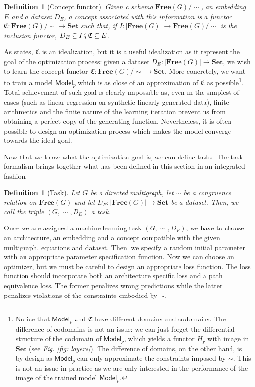 \documentclass[11pt,a4paper,openright,twoside]{report}
\newcounter{mycounter}
\theoremstyle{plain}
\newtheorem{definition}[mycounter]{Definition}
\theoremstyle{definition}
\begin{document}
\begin{definition}[Concept functor]
  Given a schema $\mathbf{Free}(G)/{\sim}$, an embedding $E$ and a dataset $D_E$, a concept associated with this information is a functor $\mathfrak{C}: \mathbf{Free}(G)/{\sim} \to \mathbf{Set}$ such that, if $I: |\mathbf{Free}(G)| \to \mathbf{Free}(G)/{\sim}$ is the inclusion functor, $D_E \subseteq I \fatsemi \mathfrak{C} \subseteq E$.
\end{definition}

As \cite{gavranovic2019compositional} states, $\mathfrak{C}$ is an idealization, but it is a useful idealization as it represent the goal of the optimization process: given a dataset $D_E: |\mathbf{Free}(G)| \to \mathbf{Set}$, we wish to learn the concept functor $\mathfrak{C}: \mathbf{Free}(G)/{\sim} \to \mathbf{Set}$. More concretely, we want to train a model $\mathsf{Model}_p$ which is as close of an approximation of $\mathfrak{C}$ as possible\footnote{Notice that $\mathsf{Model}_p$ and $\mathfrak{C}$ have different domains and codomains. The difference of codomains is not an issue: we can just forget the differential structure of the codomain of $\mathsf{Model}_p$, which yields a functor $H_p$ with image in $\mathbf{Set}$ (see \textit{Fig. \ref{fig: layers}}). The difference of domains, on the other hand, is by design as $\mathsf{Model}_p$ can only approximate the constraints imposed by $\sim$. This is not an issue in practice as we are only interested in the performance of the image of the trained model $\mathsf{Model}_p$.}. Total achievement of such goal is clearly impossible as, even in the simplest of cases (such as linear regression on synthetic linearly generated data), finite arithmetics and the finite nature of the learning iteration prevent us from obtaining a perfect copy of the generating function.
Nevertheless, it is often possible to design an optimization process which makes the model converge towards the ideal goal.

Now that we know what the optimization goal is, we can define tasks. The task formalism brings together what has been defined in this section in an integrated fashion.

\begin{definition}[Task]
  Let $G$ be a directed multigraph, let ${\sim}$ be a congruence relation on $\mathbf{Free}(G)$ and let $D_E: |\mathbf{Free}(G)| \to \mathbf{Set}$ be a dataset. Then, we call the triple $(G,{\sim},D_E)$ a task.
\end{definition}

Once we are assigned a machine learning task $(G,{\sim},D_E)$, we have to choose an architecture, an embedding and a concept compatible with the given multigraph, equations and dataset. Then, we specify a random initial parameter with an appropriate parameter specification function. Now we can choose an optimizer, but we must be careful to design an appropriate loss function. The loss function should incorporate both an architecture specific loss and a path equivalence loss. The former penalizes wrong predictions while the latter penalizes violations of the constraints embodied by ${\sim}$.
\end{document}
